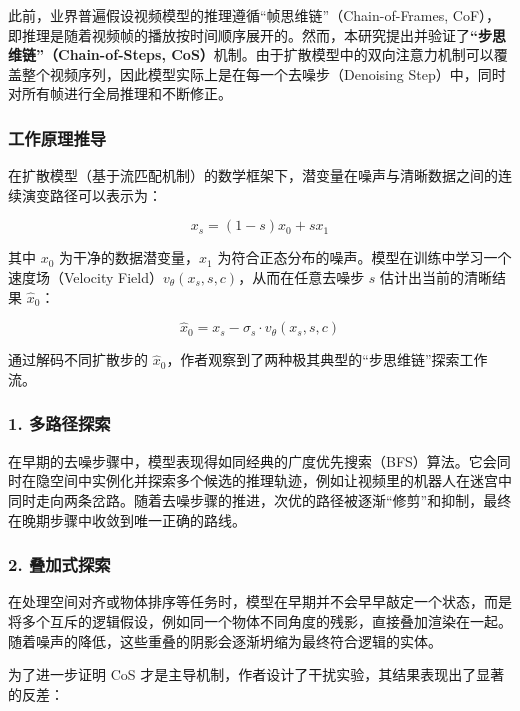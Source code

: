 此前，业界普遍假设视频模型的推理遵循``帧思维链''（Chain-of-Frames, CoF），即推理是随着视频帧的播放按时间顺序展开的。然而，本研究提出并验证了\textbf{``步思维链''（Chain-of-Steps, CoS）}机制。由于扩散模型中的双向注意力机制可以覆盖整个视频序列，因此模型实际上是在每一个去噪步（Denoising Step）中，同时对所有帧进行全局推理和不断修正。

\hypertarget{ux5de5ux4f5cux539fux7406ux63a8ux5bfc}{%
\subsubsection{工作原理推导}\label{ux5de5ux4f5cux539fux7406ux63a8ux5bfc}}

在扩散模型（基于流匹配机制）的数学框架下，潜变量在噪声与清晰数据之间的连续演变路径可以表示为：

\[
x_s=(1-s)x_0+s x_1
\]

其中 \(x_0\) 为干净的数据潜变量，\(x_1\) 为符合正态分布的噪声。模型在训练中学习一个速度场（Velocity Field）\(v_\theta(x_s,s,c)\)，从而在任意去噪步 \(s\) 估计出当前的清晰结果 \(\hat{x}_0\)：

\[
\hat{x}_0=x_s-\sigma_s\cdot v_\theta(x_s,s,c)
\]

通过解码不同扩散步的 \(\hat{x}_0\)，作者观察到了两种极其典型的``步思维链''探索工作流。

\hypertarget{ux591aux8defux5f84ux63a2ux7d22}{%
\subsubsection{1. 多路径探索}\label{ux591aux8defux5f84ux63a2ux7d22}}

在早期的去噪步骤中，模型表现得如同经典的广度优先搜索（BFS）算法。它会同时在隐空间中实例化并探索多个候选的推理轨迹，例如让视频里的机器人在迷宫中同时走向两条岔路。随着去噪步骤的推进，次优的路径被逐渐``修剪''和抑制，最终在晚期步骤中收敛到唯一正确的路线。

\hypertarget{ux53e0ux52a0ux5f0fux63a2ux7d22}{%
\subsubsection{2. 叠加式探索}\label{ux53e0ux52a0ux5f0fux63a2ux7d22}}

在处理空间对齐或物体排序等任务时，模型在早期并不会早早敲定一个状态，而是将多个互斥的逻辑假设，例如同一个物体不同角度的残影，直接叠加渲染在一起。随着噪声的降低，这些重叠的阴影会逐渐坍缩为最终符合逻辑的实体。

为了进一步证明 CoS 才是主导机制，作者设计了干扰实验，其结果表现出了显著的反差：

